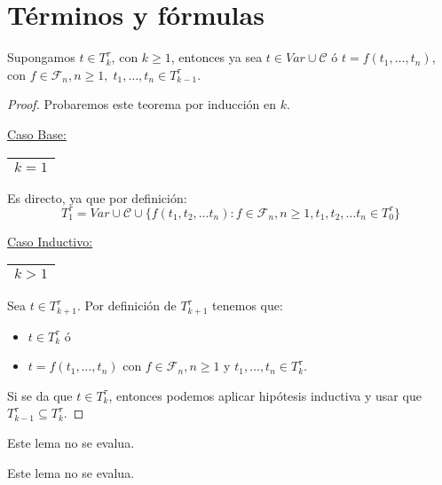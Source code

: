 \section{Términos y fórmulas}

  \begin{lemma} \label{lemma_29}
    \PN Supongamos $t \in T_{k}^{\tau}$, con $k \geq 1$, entonces ya sea $t \in Var \cup \mathcal{C}$ ó $t = f(t_{1},
    \dotsc, t_{n})$, con $f \in \mathcal{F}_{n}, n \geq 1, \; t_{1}, \dotsc, t_{n} \in T_{k-1}^{\tau}$.
  \end{lemma}
  \begin{proof}
    \PN Probaremos este teorema por inducción en $k$.

    \vspace{3mm}
    \PN \underline{Caso Base:} \begin{tabular}{|c|} \hline $k = 1$ \\\hline \end{tabular} Es directo, ya que por
    definición:
    \[
      T_{1}^{\tau} = Var \cup \mathcal{C} \cup \{f(t_{1}, t_{2}, \dotsc t_{n}): f \in \mathcal{F}_n, n \geq 1, t_{1},
      t_{2}, \dotsc t_{n} \in T_{0}^{\tau}\}
    \]

		\PN \underline{Caso Inductivo:} \begin{tabular}{|c|} \hline $k > 1$ \\\hline \end{tabular} Sea $t \in
    T_{k+1}^{\tau}$. Por definición de $ T_{k+1}^{\tau}$ tenemos que:
    \begin{itemize}
      \item $t \in T_{k}^{\tau}$ ó
      \item $t = f(t_{1}, \dotsc, t_{n})$ con $f \in \mathcal{F}_{n}, n \geq 1$ y $t_{1}, \dotsc, t_{n}\in T_{k}^{\tau}$.
    \end{itemize}

    \PN Si se da que $t \in T_{k}^{\tau}$, entonces podemos aplicar hipótesis inductiva y usar que $T_{k-1}^{\tau}
    \subseteq T_{k}^{\tau}$.
  \end{proof}

  \begin{lemma}
    \PN Este lema no se evalua.
  \end{lemma}

  \begin{lemma}
    \PN Este lema no se evalua.
  \end{lemma}

